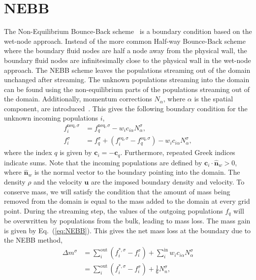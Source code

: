 \documentclass[fleqn,a4paper]{article} %
\numberwithin{equation}{section} %
\numberwithin{figure}{section} %
\numberwithin{table}{section} %
\numberwithin{algorithm}{section} %
\begin{document}
\section{NEBB}
The Non-Equilibrium Bounce-Back scheme~\cite{zou_pressure_1997} is a boundary condition based on the wet-node approach. Instead of the more common Half-way Bounce-Back scheme where the boundary fluid nodes are half a node away from the physical wall, the boundary fluid nodes are infinitesimally close to the physical wall in the wet-node approach. The NEBB scheme leaves the populations streaming out of the domain unchanged after streaming. The unknown populations streaming into the domain can be found using the non-equilibrium parts of the populations streaming out of the domain. Additionally, momentum corrections $N_\alpha$, where $\alpha$ is the spatial component, are introduced~\cite{kruger_lattice_2017}. This gives the following boundary condition for the unknown incoming populations $i$,
\begin{equation}\label{eq:NEBB}
\begin{split}
    f_i^{\text{neq},\sigma} &= f_q^{\text{neq},\sigma} - w_i c_{i\alpha} N_\alpha^\sigma,\\
    f_i^\sigma &= f_q^\sigma + \left(f_i^{\text{eq},\sigma} - f_q^{\text{eq},\sigma}\right) - w_i c_{i\alpha} N_\alpha^\sigma,
\end{split}
\end{equation}
where the index $q$ is given by $\bm{c}_i = -\bm{c}_q$. Furthermore, repeated Greek indices indicate sums. Note that the incoming populations are defined by $\bm{c}_i \cdot \hat{\bm{n}}_w > 0$, where $\hat{\bm{n}}_w$ is the normal vector to the boundary pointing into the domain. The density $\rho$ and the velocity $\bm{u}$ are the imposed boundary density and velocity. To conserve mass, we will satisfy the condition that the amount of mass being removed from the domain is equal to the mass added to the domain at every grid point. During the streaming step, the values of the outgoing populations $f_q$ will be overwritten by populations from the bulk, leading to mass loss. The mass gain is given by Eq.~(\ref{eq:NEBB}). This gives the net mass loss at the boundary due to the NEBB method,
\begin{equation}\label{eq:NEBB mass loss}
\begin{split}
    \Delta m^\sigma &= \sum_i^\text{out}\left(f_i^{*,\sigma} - f_i^\sigma\right) + \sum_i^\text{in} w_i c_{i\alpha}N_\alpha^\sigma\\
    &= \sum_i^{\text{out}}\left(f_i^{*,\sigma} - f_i^\sigma\right) + \frac{1}{6} N_{n}^\sigma,
\end{split}
\end{equation}
\end{document}
